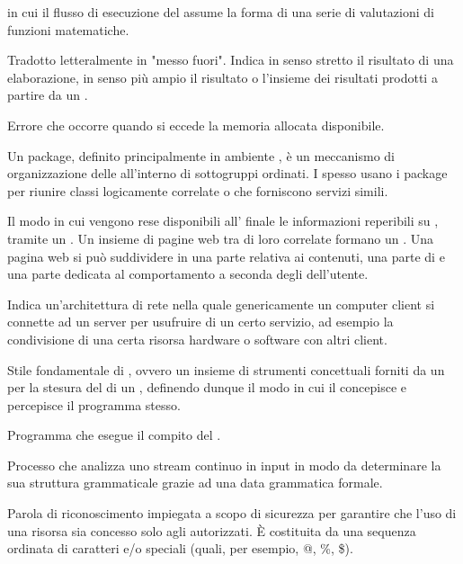 { in cui il flusso di esecuzione del  assume la forma di una serie di valutazioni di funzioni matematiche.}

{Tradotto letteralmente in "messo fuori". Indica in senso stretto il risultato di una elaborazione, in senso più ampio il risultato o l'insieme dei risultati prodotti a partire da un .}

{Errore che occorre quando si eccede la memoria allocata disponibile.}




{Un package, definito principalmente in ambiente , è un meccanismo di organizzazione delle  all'interno di sottogruppi ordinati. I  spesso usano i package per riunire classi logicamente correlate o che forniscono servizi simili.}

{Il modo in cui vengono rese disponibili all' finale le informazioni reperibili su , tramite un . Un insieme di pagine web tra di loro correlate formano un . Una pagina web si può suddividere in una parte relativa ai contenuti, una parte di  e una parte dedicata al comportamento a seconda degli  dell'utente.}

{Indica un'architettura di rete nella quale genericamente un computer client si connette ad un server per usufruire di un certo servizio, ad esempio la condivisione di una certa risorsa hardware o software con altri client.}

{Stile fondamentale di , ovvero un insieme di strumenti concettuali forniti da un  per la stesura del  di un , definendo dunque il modo in cui il  concepisce e percepisce il programma stesso.}

{Programma che esegue il compito del .}

{Processo che analizza uno stream continuo in input in modo da determinare la sua struttura grammaticale grazie ad una data grammatica formale.}

{Parola di riconoscimento impiegata a scopo di sicurezza per garantire che l'uso di una risorsa sia concesso solo agli  autorizzati. \`{E} costituita da una sequenza ordinata di caratteri  e/o speciali (quali, per esempio, @, \%, \$).}

